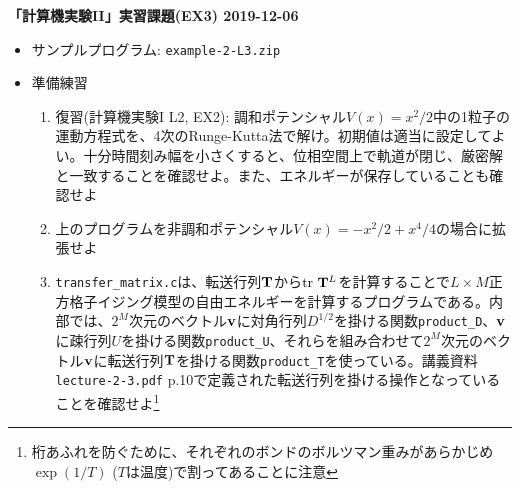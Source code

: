 \documentclass{jarticle}
\begin{document}
\noindent
{\bf\large 「計算機実験II」実習課題(EX3) 2019-12-06}
\\[-0.5em]

\noindent
\begin{itemize}

\item サンプルプログラム: {\tt example-2-L3.zip}

\item 準備練習

\begin{enumerate}
\item 復習(計算機実験I L2, EX2): 調和ポテンシャル$V(x)=x^2/2$中の1粒子の運動方程式を、4次のRunge-Kutta法で解け。初期値は適当に設定してよい。十分時間刻み幅を小さくすると、位相空間上で軌道が閉じ、厳密解と一致することを確認せよ。また、エネルギーが保存していることも確認せよ
\item 上のプログラムを非調和ポテンシャル$V(x)=-x^2/2+x^4/4$の場合に拡張せよ
  \item {\tt transfer\_matrix.c}は、転送行列${\bf T}$から${\rm tr}\ {\bf T}^L$を計算することで$L \times M$正方格子イジング模型の自由エネルギーを計算するプログラムである。内部では、$2^M$次元のベクトル${\bf v}$に対角行列$D^{1/2}$を掛ける関数{\tt product\_D}、${\bf v}$に疎行列$U$を掛ける関数{\tt product\_U}、それらを組み合わせて$2^M$次元のベクトル${\bf v}$に転送行列${\bf T}$を掛ける関数{\tt product\_T}を使っている。講義資料 {\tt lecture-2-3.pdf} p.10で定義された転送行列を掛ける操作となっていることを確認せよ\footnote{桁あふれを防ぐために、それぞれのボンドのボルツマン重みがあらかじめ$\exp(1/T)$ ($T$は温度)で割ってあることに注意}
\end{enumerate}


\end{itemize}
\end{document}
